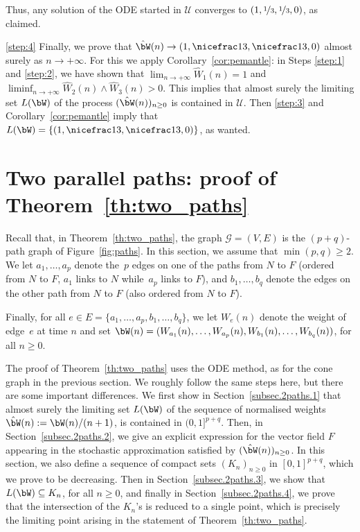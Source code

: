 Thus, any solution of the ODE started in
$\mathcal U$ converges to $(1,\nicefrac13, \nicefrac13, 0)$, as claimed.

\eqref{step:4} Finally, we prove that $\hat\bW(n) \to (1,\nicefrac13, \nicefrac13, {0})$ almost surely as $n\to+\infty$. For this we apply Corollary~\ref{cor:pemantle}: in Steps \eqref{step:1} and \eqref{step:2}, we have shown that
$\lim_{n\to+\infty} \hat W_1(n) = 1$ and $\liminf_{n\to+\infty} \hat W_2(n)\wedge \hat W_3(n)>0$.
This implies that almost surely the limiting set $L(\bW)$ of the process $(\hat {\bW}(n))_{n\ge 0}$ is contained in $\mathcal U$.
Then \eqref{step:3} and Corollary~\ref{cor:pemantle} imply that $L(\bW)= \{(1, \nicefrac13, \nicefrac13, 0)\}$, as wanted.

\section{Two parallel paths: proof of Theorem~\ref{th:two_paths}}\label{sec:2paths}
Recall that, in Theorem~\ref{th:two_paths},
the graph $\mathcal G=(V,E)$ is the $(p+q)$-path graph of Figure~\ref{fig:paths}.
In this section, we assume that $\min(p,q)\geq 2$.
We let $a_1, \ldots, a_p$ denote the~$p$ edges on one of the paths from $N$ to $F$ (ordered from $N$ to $F$, \ie $a_1$ links to $N$ while~$a_p$ links to $F$), and $b_1, \ldots, b_q$ denote the edges on the other path from $N$ to $F$ (also ordered from $N$ to $F$).

Finally, for all $e\in E=\{a_1, \ldots, a_p, b_1, \ldots, b_q\}$, we let $W_e(n)$ denote the weight of edge~$e$ at time $n$ and set $\bW(n) = (W_{a_1}(n), \ldots, W_{a_p}(n), W_{b_1}(n), \ldots, W_{b_q}(n))$, for all $n\geq 0$.

The proof of Theorem~\ref{th:two_paths} uses the ODE method, as for the cone graph in the previous section. We roughly follow the same steps here, but there are some important differences.
We first show in Section~\ref{subsec.2paths.1} that almost surely the limiting set $L(\bW)$ of the sequence of normalised weights $\hat{\bW}(n):=\bW(n)/(n+1)$,
is contained in $(0,1]^{p+q}$. Then, in Section~\ref{subsec.2paths.2}, we give an explicit expression for the vector field $F$ appearing in the stochastic approximation satisfied by $(\hat{\bW}(n))_{n\ge 0}$.
{In this section, we also define a sequence of compact sets $(K_n)_{n\ge 0}$ in $[0,1]^{p+q}$, which we prove to be decreasing. }
Then in Section~\ref{subsec.2paths.3}, we show that $L(\bW)\subseteq K_n$, for all $n\ge 0$, and finally in Section~\ref{subsec.2paths.4}, we prove that the intersection of the $K_n$'s is reduced to a single point, which is precisely the limiting point arising in the statement of Theorem~\ref{th:two_paths}.

